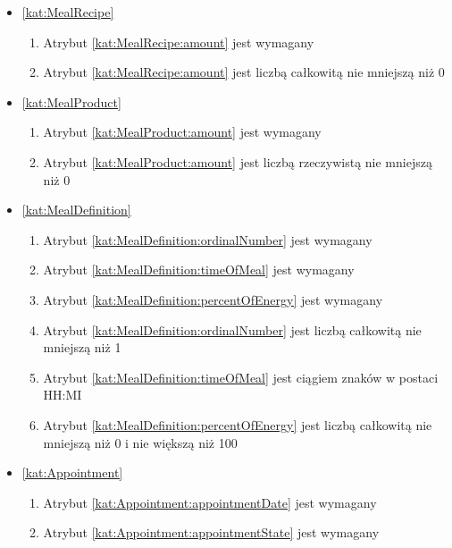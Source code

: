 \begin{itemize}[label={\textbf{Ograniczenia dla}}, wide, labelwidth=!, labelindent=0pt]
    \item\ref{kat:MealRecipe}
    \begin{enumerate}[label={\textbf{OGR/\protect\threedigits{\arabic{enumi}}}}, wide, labelwidth=!, align=left, leftmargin=3cm, resume]
        \item Atrybut \ref{kat:MealRecipe:amount} jest wymagany

        \item Atrybut \ref{kat:MealRecipe:amount} jest liczbą całkowitą nie mniejszą niż 0
    \end{enumerate}

    \item\ref{kat:MealProduct}
    \begin{enumerate}[label={\textbf{OGR/\protect\threedigits{\arabic{enumi}}}}, wide, labelwidth=!, align=left, leftmargin=3cm, resume]
        \item Atrybut \ref{kat:MealProduct:amount} jest wymagany

        \item Atrybut \ref{kat:MealProduct:amount} jest liczbą rzeczywistą nie mniejszą niż 0
    \end{enumerate}

    \item\ref{kat:MealDefinition}
    \begin{enumerate}[label={\textbf{OGR/\protect\threedigits{\arabic{enumi}}}}, wide, labelwidth=!, align=left, leftmargin=3cm, resume]
        \item Atrybut \ref{kat:MealDefinition:ordinalNumber} jest wymagany
        \item Atrybut \ref{kat:MealDefinition:timeOfMeal} jest wymagany
        \item Atrybut \ref{kat:MealDefinition:percentOfEnergy} jest wymagany

        \item Atrybut \ref{kat:MealDefinition:ordinalNumber} jest liczbą całkowitą nie mniejszą niż 1
        \item Atrybut \ref{kat:MealDefinition:timeOfMeal} jest ciągiem znaków w postaci HH:MI
        \item Atrybut \ref{kat:MealDefinition:percentOfEnergy} jest liczbą całkowitą nie mniejszą niż 0 i nie większą niż 100
    \end{enumerate}

    \item\ref{kat:Appointment}
    \begin{enumerate}[label={\textbf{OGR/\protect\threedigits{\arabic{enumi}}}}, wide, labelwidth=!, align=left, leftmargin=3cm, resume]
        \item Atrybut \ref{kat:Appointment:appointmentDate} jest wymagany
        \item Atrybut \ref{kat:Appointment:appointmentState} jest wymagany


\end{enumerate}
\end{itemize}
